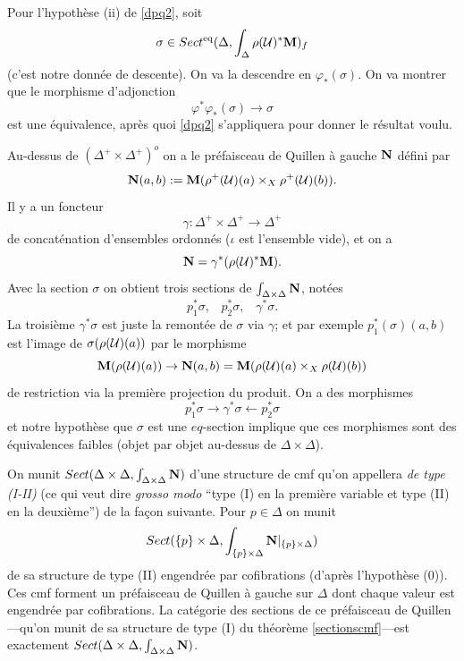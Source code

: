\documentclass[12pt]{article}
\newcommand{\mm}{{\bf M}}
\newcommand{\nn}{{\bf N}}
\newcommand{\Uu}{{\cal U}}
\begin{document}
Pour l'hypoth\`ese (ii) de \ref{dpq2}, soit
$$
\sigma \in
Sect ^{\rm eq}(\Delta , \int _{\Delta}\rho (\Uu )^{\ast}\mm )_f
$$
(c'est notre donn\'ee de descente). On va la descendre en $\varphi _{\ast}
(\sigma )$.
On va montrer que le morphisme d'adjonction
$$
\varphi ^{\ast} \varphi _{\ast} (\sigma )\rightarrow \sigma
$$
est une \'equivalence, apr\`es quoi \ref{dpq2} s'appliquera pour donner le
r\'esultat voulu.



Au-dessus de $(\Delta ^+\times \Delta ^+)^o$ on a le pr\'efaisceau
de Quillen \`a gauche $\nn$ d\'efini par
$$
\nn (a,b) := \mm (\rho ^+ (\Uu )(a) \times _X \rho ^+ (\Uu )(b)).
$$
Il y a un foncteur
$$
\gamma : \Delta ^+ \times \Delta ^+ \rightarrow
\Delta ^+
$$
de concat\'enation d'ensembles ordonn\'es ($\iota$ est l'ensemble vide),
et on a
$$
\nn = \gamma ^{\ast} (\rho (\Uu )^{\ast}\mm ).
$$
Avec la section $\sigma$ on obtient trois sections de $\int _{\Delta \times
\Delta} \nn$, not\'ees
$$
p_1^{\ast}\sigma , \;\;\;
p_2^{\ast}\sigma , \;\;\;
\gamma ^{\ast}\sigma .
$$
La troisi\`eme $\gamma ^{\ast}\sigma$ est juste la remont\'ee de $\sigma$ via
$\gamma$; et par exemple $p_1^{\ast}(\sigma )(a,b)$ est l'image de
$\sigma (\rho (\Uu )(a))$ par le morphisme
$$
\mm (\rho (\Uu )(a))\rightarrow \nn (a,b) = \mm (\rho (\Uu )(a)\times
_X\rho (\Uu
) (b))
$$
de restriction via la premi\`ere projection du produit.
On a des morphismes
$$
p_1^{\ast}\sigma \rightarrow \gamma ^{\ast} \sigma \leftarrow p_2^{\ast} \sigma
$$
et notre hypoth\`ese que $\sigma$ est une $eq$-section implique que ces
morphismes sont des \'e\-qui\-va\-len\-ces faibles (objet par objet au-dessus de
$\Delta
\times \Delta$).

On munit
$Sect (\Delta \times \Delta ,
\int _{\Delta \times \Delta}\nn )$
d'une structure de cmf qu'on appellera {\em de type (I-II)} (ce qui veut dire
{\em grosso modo} ``type (I) en la premi\`ere variable et type (II) en la
deuxi\`eme'') de la fa\c{c}on suivante. Pour $p\in \Delta$ on munit
$$
Sect (\{ p\} \times \Delta   ,
\int _{\{ p\} \times \Delta   }\nn |_{\{ p\} \times \Delta })
$$
de sa structure de type (II) engendr\'ee par cofibrations (d'apr\`es
l'hypoth\`ese (0)). Ces cmf forment un pr\'efaisceau de Quillen \`a gauche sur
$\Delta$ dont chaque valeur est engendr\'ee par cofibrations. La cat\'egorie des
sections de ce pr\'efaisceau de Quillen---qu'on munit de sa structure de type
(I) du th\'eor\`eme \ref{sectionscmf}---est exactement $Sect (\Delta \times
\Delta , \int _{\Delta \times \Delta}\nn )$.
\end{document}
